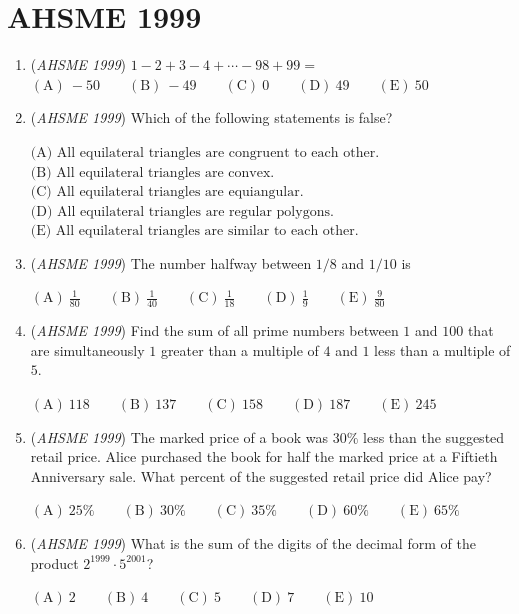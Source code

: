 \section{AHSME 1999}
        \begin{enumerate}
        	\item (\textit{AHSME 1999}) $1 - 2 + 3 -4 + \cdots - 98 + 99 =$
$\mathrm{(A) \ -50 } \qquad \mathrm{(B) \ -49 } \qquad \mathrm{(C) \ 0 } \qquad \mathrm{(D) \ 49 } \qquad \mathrm{(E) \ 50 }$


	\item (\textit{AHSME 1999}) Which of the following statements is false?


 $\text{(A) All equilateral triangles are congruent to each other.}$
$\text{(B) All equilateral triangles are convex.}$
$\text{(C) All equilateral triangles are equiangular.}$
$\text{(D) All equilateral triangles are regular polygons.}$
$\text{(E) All equilateral triangles are similar to each other.}$


	\item (\textit{AHSME 1999}) The number halfway between $1/8$ and $1/10$ is 


 $\mathrm{(A) \  } \frac 1{80} \qquad \mathrm{(B) \  } \frac 1{40} \qquad \mathrm{(C) \  } \frac 1{18} \qquad \mathrm{(D) \  } \frac 1{9} \qquad \mathrm{(E) \  } \frac 9{80}$


	\item (\textit{AHSME 1999}) Find the sum of all prime numbers between $1$ and $100$ that are simultaneously $1$ greater than a multiple of $4$ and $1$ less than a multiple of $5$. 


 $\mathrm{(A) \ } 118 \qquad \mathrm{(B) \ }137 \qquad \mathrm{(C) \ } 158 \qquad \mathrm{(D) \ } 187 \qquad \mathrm{(E) \ } 245$


	\item (\textit{AHSME 1999}) The marked price of a book was $30 \%$ less than the suggested retail price. Alice purchased the book for half the marked price at a Fiftieth Anniversary sale. What percent of the suggested retail price did Alice pay?


 $\mathrm{(A) \ }25 \% \qquad \mathrm{(B) \ }30 \% \qquad \mathrm{(C) \ }35 \% \qquad \mathrm{(D) \ }60 \% \qquad \mathrm{(E) \ }65 \%$


	\item (\textit{AHSME 1999}) What is the sum of the digits of the decimal form of the product $2^{1999} \cdot 5^{2001}$?


 $\mathrm{(A) \ }2 \qquad \mathrm{(B) \ }4 \qquad \mathrm{(C) \ }5 \qquad \mathrm{(D) \ }7 \qquad \mathrm{(E) \ }10$



\end{enumerate}
